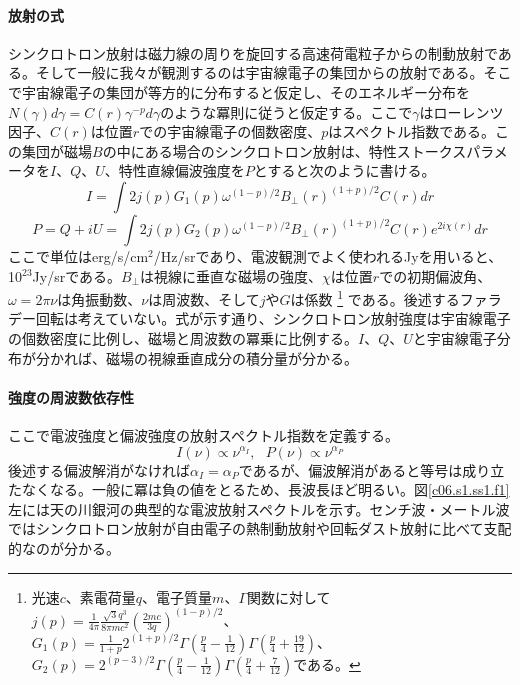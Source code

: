 \paragraph{放射の式}

シンクロトロン放射は磁力線の周りを旋回する高速荷電粒子からの制動放射である。そして一般に我々が観測するのは宇宙線電子の集団からの放射である。そこで宇宙線電子の集団が等方的に分布すると仮定し、そのエネルギー分布を$N(\gamma)d\gamma=C(r)\gamma^{-p}d\gamma$のような冪則に従うと仮定する。ここで$\gamma$はローレンツ因子、$C(r)$は位置$r$での宇宙線電子の個数密度、$p$はスペクトル指数である。この集団が磁場$B$の中にある場合のシンクロトロン放射は、特性ストークスパラメータを$I$、$Q$、$U$、特性直線偏波強度を$P$とすると次のように書ける。
\begin{equation}
I = \int 2j(p)G_1(p)\omega^{(1-p)/2}B_\perp(r)^{(1+p)/2}C(r) dr
\end{equation}
\begin{equation}
P = Q + iU = \int 2j(p)G_2(p)\omega^{(1-p)/2}B_\perp(r)^{(1+p)/2}C(r)e^{2i\chi(r)} dr
\end{equation}
ここで単位はerg/s/cm$^2$/Hz/srであり、電波観測でよく使われるJyを用いると、10$^{23}$Jy/srである。$B_\perp$は視線に垂直な磁場の強度、$\chi$は位置$r$での初期偏波角、$\omega = 2 \pi \nu$は角振動数、$\nu$は周波数、そして$j$や$G$は係数
\footnote{
光速$c$、素電荷量$q$、電子質量$m$、$\Gamma$関数に対して
$j(p)=\frac{1}{4\pi}\frac{\sqrt{3}q^3}{8\pi mc^2}\left(\frac{2mc}{3q}\right)^{(1-p)/2}$、\\
$G_1(p)=\frac{1}{1+p}2^{(1+p)/2}
\Gamma \left(\frac{p}{4}-\frac{1}{12}\right)
\Gamma \left(\frac{p}{4}+\frac{19}{12}\right)
$、
$
G_2(p)=2^{(p-3)/2}
\Gamma \left(\frac{p}{4}-\frac{1}{12}\right)
\Gamma \left(\frac{p}{4}+\frac{7}{12}\right)
$である。
}
である。後述するファラデー回転は考えていない。式が示す通り、シンクロトロン放射強度は宇宙線電子の個数密度に比例し、磁場と周波数の冪乗に比例する。$I$、$Q$、$U$と宇宙線電子分布が分かれば、磁場の視線垂直成分の積分量が分かる。

\paragraph{強度の周波数依存性}

ここで電波強度と偏波強度の放射スペクトル指数を定義する。
\begin{equation}
I(\nu)\propto \nu^{\alpha_I},~~~P(\nu)\propto \nu^{\alpha_P}
\end{equation}
後述する偏波解消がなければ$\alpha_I=\alpha_P$であるが、偏波解消があると等号は成り立たなくなる。一般に冪は負の値をとるため、長波長ほど明るい。図\ref{c06.s1.ss1.f1}左には天の川銀河の典型的な電波放射スペクトルを示す。センチ波・メートル波ではシンクロトロン放射が自由電子の熱制動放射や回転ダスト放射に比べて支配的なのが分かる。

